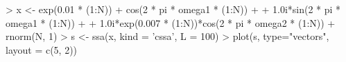 \begin{CodeChunk}
\begin{CodeInput}


> x <- exp(0.01 * (1:N)) + cos(2 * pi * omega1 * (1:N)) + 
+   1.0i*sin(2 * pi * omega1 * (1:N)) + 
+   1.0i*exp(0.007 * (1:N))*cos(2 * pi * omega2 * (1:N)) + rnorm(N, 1) 
> s <- ssa(x, kind = 'cssa', L = 100)
> plot(s, type="vectors", layout = c(5, 2))
\end{CodeInput}

\end{CodeChunk}
